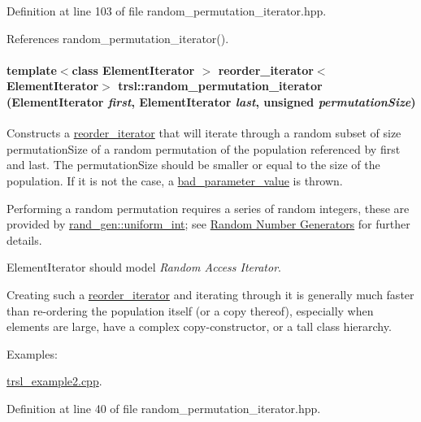 Definition at line 103 of file random\_\-permutation\_\-iterator.hpp.

References random\_\-permutation\_\-iterator().\hypertarget{namespacetrsl_afb566791dfade70af49beaa5b816e7ee}{
\paragraph[{random\_\-permutation\_\-iterator}]{\setlength{\rightskip}{0pt plus 5cm}template$<$class ElementIterator $>$ {\bf reorder\_\-iterator}$<$ElementIterator$>$ trsl::random\_\-permutation\_\-iterator (ElementIterator {\em first}, \/  ElementIterator {\em last}, \/  unsigned {\em permutationSize})}\hfill}
\label{namespacetrsl_afb566791dfade70af49beaa5b816e7ee}


Constructs a \hyperlink{classtrsl_1_1reorder__iterator}{reorder\_\-iterator} that will iterate through a random subset of size {\ttfamily permutationSize} of a random permutation of the population referenced by {\ttfamily first} and {\ttfamily last}. The {\ttfamily permutationSize} should be smaller or equal to the size of the population. If it is not the case, a \hyperlink{classtrsl_1_1bad__parameter__value}{bad\_\-parameter\_\-value} is thrown.

Performing a random permutation requires a series of random integers, these are provided by \hyperlink{namespacetrsl_1_1rand__gen_a8b8ab155014f708c35fb7594c8d13a81}{rand\_\-gen::uniform\_\-int}; see \hyperlink{group__random}{Random Number Generators} for further details.

{\ttfamily ElementIterator} should model {\itshape Random Access Iterator\/}.

Creating such a \hyperlink{classtrsl_1_1reorder__iterator}{reorder\_\-iterator} and iterating through it is generally much faster than re-\/ordering the population itself (or a copy thereof), especially when elements are large, have a complex copy-\/constructor, or a tall class hierarchy. \begin{Desc}
\item[Examples: ]\par
\hyperlink{trsl__example2_8cpp-example}{trsl\_\-example2.cpp}.\end{Desc}


Definition at line 40 of file random\_\-permutation\_\-iterator.hpp.

